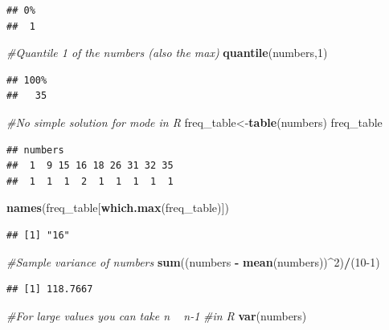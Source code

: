 \documentclass[]{book}
\newenvironment{Shaded}{\begin{snugshade}}{\end{snugshade}}
\newcommand{\CommentTok}[1]{\textcolor[rgb]{0.56,0.35,0.01}{\textit{#1}}}
\newcommand{\DecValTok}[1]{\textcolor[rgb]{0.00,0.00,0.81}{#1}}
\newcommand{\KeywordTok}[1]{\textcolor[rgb]{0.13,0.29,0.53}{\textbf{#1}}}
\newcommand{\NormalTok}[1]{#1}
\newcommand{\OperatorTok}[1]{\textcolor[rgb]{0.81,0.36,0.00}{\textbf{#1}}}
\newcommand{\StringTok}[1]{\textcolor[rgb]{0.31,0.60,0.02}{#1}}
\theoremstyle{definition}
\theoremstyle{definition}
\theoremstyle{definition}
\theoremstyle{remark}
\begin{document}
\begin{verbatim}
## 0% 
##  1
\end{verbatim}

\begin{Shaded}
\begin{Highlighting}[]
\CommentTok{#Quantile 1 of the numbers (also the max)}
\KeywordTok{quantile}\NormalTok{(numbers,}\DecValTok{1}\NormalTok{)}
\end{Highlighting}
\end{Shaded}

\begin{verbatim}
## 100% 
##   35
\end{verbatim}

\begin{Shaded}
\begin{Highlighting}[]
\CommentTok{#No simple solution for mode in R}
\NormalTok{freq_table<-}\KeywordTok{table}\NormalTok{(numbers)}
\NormalTok{freq_table}
\end{Highlighting}
\end{Shaded}

\begin{verbatim}
## numbers
##  1  9 15 16 18 26 31 32 35 
##  1  1  1  2  1  1  1  1  1
\end{verbatim}

\begin{Shaded}
\begin{Highlighting}[]
\KeywordTok{names}\NormalTok{(freq_table[}\KeywordTok{which.max}\NormalTok{(freq_table)])}
\end{Highlighting}
\end{Shaded}

\begin{verbatim}
## [1] "16"
\end{verbatim}

\begin{Shaded}
\begin{Highlighting}[]
\CommentTok{#Sample variance of numbers}
\KeywordTok{sum}\NormalTok{((numbers }\OperatorTok{-}\StringTok{ }\KeywordTok{mean}\NormalTok{(numbers))}\OperatorTok{^}\DecValTok{2}\NormalTok{)}\OperatorTok{/}\NormalTok{(}\DecValTok{10-1}\NormalTok{)}
\end{Highlighting}
\end{Shaded}

\begin{verbatim}
## [1] 118.7667
\end{verbatim}

\begin{Shaded}
\begin{Highlighting}[]
\CommentTok{#For large values you can take n ~ n-1}
\CommentTok{#in R}
\KeywordTok{var}\NormalTok{(numbers)}
\end{Highlighting}
\end{Shaded}
\end{document}
